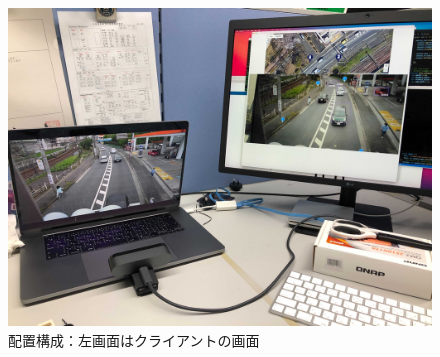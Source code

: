 \documentclass[technicalreport]{ieicej}
\begin{document}
\begin{figure}[t]
  \includegraphics*[bb=0 0 4100 3000, width=1\linewidth]{./images/kensyo.jpg}
  \caption{配置構成：左画面はクライアントの画面} 
  \label{tab:kensyo}
\end{figure}
\end{document}
